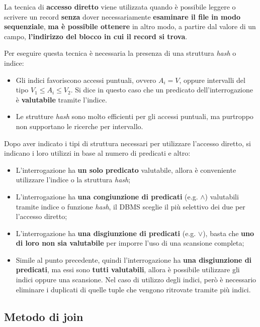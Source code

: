 \documentclass[a4paper]{article}
\begin{document}
	La tecnica di \textcolor{Red3}{\textbf{accesso diretto}} viene utilizzata quando è possibile leggere o scrivere un record \textbf{senza} dover necessariamente \textbf{esaminare il file in modo sequenziale}, \textbf{ma è possibile ottenere} in altro modo, a partire dal valore di un campo, \textbf{l'indirizzo del blocco in cui il record si trova}.\newline
	
	\noindent
	Per eseguire questa tecnica è necessaria la presenza di una struttura \emph{hash} o indice:
	\begin{itemize}
		\item Gli indici favoriscono accessi puntuali, ovvero $A_{i} = V$, oppure intervalli del tipo $V_{1} \le A_{i} \le V_{2}$. Si dice in questo caso che un predicato dell'interrogazione è \textbf{valutabile} tramite l'indice.
		
		\item Le strutture \emph{hash} sono molto efficienti per gli accessi puntuali, ma purtroppo non supportano le ricerche per intervallo.
	\end{itemize}
	Dopo aver indicato i tipi di struttura necessari per utilizzare l'accesso diretto, si indicano i loro utilizzi in base al numero di predicati e altro:
	\begin{itemize}
		\item L'interrogazione ha \textbf{un solo predicato} valutabile, allora è conveniente utilizzare l'indice o la struttura \emph{hash};
		
		\item L'interrogazione ha \textbf{una congiunzione di predicati} (e.g. $\land$) valutabili tramite indice o funzione \emph{hash}, il DBMS sceglie il più selettivo dei due per l'accesso diretto;
		
		\item L'interrogazione ha \textbf{una disgiunzione di predicati} (e.g. $\lor$), basta che \textbf{uno di loro non sia valutabile} per imporre l'uso di una scansione completa;
		
		\item Simile al punto precedente, quindi l'interrogazione ha \textbf{una disgiunzione di predicati}, ma essi sono \textbf{tutti valutabili}, allora è possibile utilizzare gli indici oppure una scansione. Nel caso di utilizzo degli indici, però è necessario eliminare i duplicati di quelle tuple che vengono ritrovate tramite più indici.
	\end{itemize}\newpage
	
	\subsection{Metodo di join}
	
\end{document}
